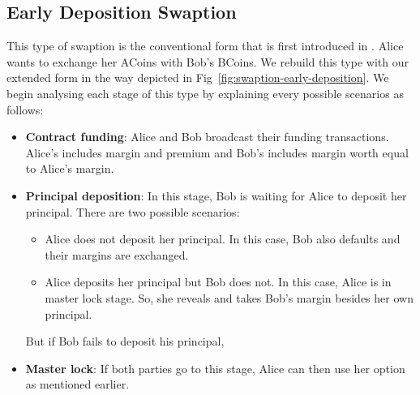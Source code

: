 




\subsection{Early Deposition Swaption}
\label{app:conv-swaption}

This type of swaption is the conventional form that is first introduced in \cite{liu2018atomic}. Alice wants to exchange her ACoins with Bob's BCoins. We rebuild this type with our \MetaSwaption extended form in the way depicted in Fig~\ref{fig:swaption-early-deposition}. We begin analysing each stage of this type by explaining every possible scenarios as follows:

\begin{itemize}
    \item \textbf{Contract funding}: Alice and Bob broadcast their funding transactions. Alice's includes margin and premium and Bob's includes margin worth equal to Alice's margin.
    
    \item \textbf{Principal deposition}: In this stage, Bob is waiting for Alice to deposit her principal. There are two possible scenarios:
    \begin{itemize}
        \item Alice does not deposit her principal. In this case, Bob also defaults and their margins are exchanged.
        \item Alice deposits her principal but Bob does not. In this case, Alice is in master lock stage. So, she reveals \Atwo and takes Bob's margin besides her own principal.
    \end{itemize}
     But if Bob fails to deposit his principal, 
    
    \item \textbf{Master lock}: If both parties go to this stage, Alice can then use her option as mentioned earlier.
\end{itemize}

